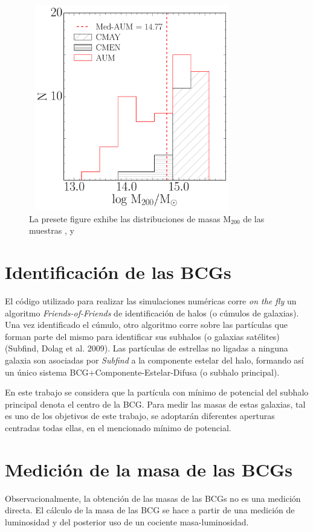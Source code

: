 \begin{figure}[H]
 \centering
 \includegraphics[height=9cm, width=9cm]{../al_final/LR/evolucion/histogramas/quilombo.pdf}
 \caption{La presete figure exhibe las distribuciones de masas M$_{200}$ de las muestras \cmay, \cmen y \aum}
 \label{fig:distribuciones}
\end{figure}


\section{Identificaci\'on de las BCGs}
El c\'odigo utilizado para realizar las simulaciones num\'ericas corre \textit{on the fly} un algoritmo {\it Friends-of-Friends} 
de identificaci\'on de halos (o c\'umulos de galaxias). Una vez identificado el c\'umulo, otro algoritmo corre sobre las part\'iculas que
forman parte del mismo para identificar sus subhalos (o galaxias sat\'elites) (Subfind, Dolag et al. 2009). Las part\'iculas de estrellas no 
ligadas a ninguna galaxia son asociadas por {\it Subfind} a la componente estelar del halo, formando as\'i un \'unico sistema BCG+Componente-Estelar-Difusa (o subhalo principal).

En este trabajo se considera que la part\'icula con m\'inimo de potencial del subhalo principal denota el centro de la BCG.
Para medir las masas de estas galaxias, tal es uno de los objetivos de este trabajo, se adoptar\'an diferentes aperturas centradas todas ellas, en el mencionado m\'inimo de potencial. 

\section{Medici\'on de la masa de las BCGs}
Observacionalmente, la obtenci\'on de las masas de las BCGs no es una medici\'on directa. El c\'alculo de la masa de las BCG se hace a
partir de una medici\'on de luminosidad y del posterior uso de un cociente masa-luminosidad.

